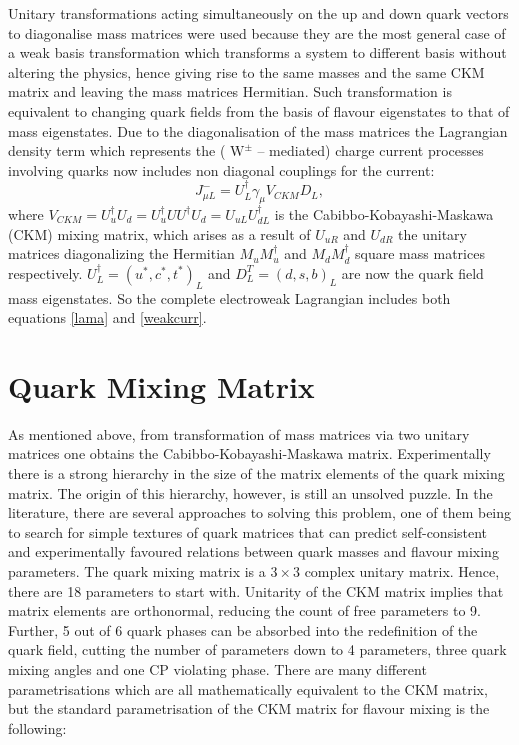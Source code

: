 \newline
\indent Unitary transformations acting simultaneously on the up and down quark vectors \cite{fritz} to diagonalise mass matrices were used because they are the most general case of a weak basis transformation which transforms a system to different basis without altering the physics, hence giving rise to the same masses and the same CKM matrix and leaving the mass matrices Hermitian. Such transformation is equivalent to changing quark fields from the basis of flavour eigenstates to that of mass eigenstates.
\newline
\indent Due to the diagonalisation of the mass matrices the Lagrangian density term which represents the ( $\text{W}^\pm$ -- mediated) charge current processes involving quarks now includes non diagonal couplings for the current:
\begin{equation}\label{weakcurr}
J_{\mu L}^-= U_{L}^{\dagger}\gamma_\mu V_{CKM}D_{L},
\end{equation}
where  $V_{CKM}= U_u^{\dagger} U_d= U_u^{\dag} U U^{\dag} U_d = U_{uL} U_{dL}^\dag$ is the Cabibbo-Kobayashi-Maskawa (CKM) mixing matrix, which arises as a result of $U_{uR}$ and $U_{dR}$ the unitary matrices diagonalizing the Hermitian $M_uM_u^\dagger$ and $M_dM_d^\dagger$ square mass matrices respectively. $U_{L}^\dagger =( u^{*}, c^{*}, t^{*})_L$ and $D_{L}^T=(d,s,b)_L$ are now the quark field mass eigenstates. So the complete electroweak Lagrangian includes both equations \ref{lama} and \ref{weakcurr}.

\section{Quark Mixing Matrix}
\indent As mentioned above, from transformation of mass matrices via two unitary matrices one obtains the Cabibbo-Kobayashi-Maskawa matrix. Experimentally there is a strong hierarchy in the size of the matrix elements of the quark mixing matrix. The origin of this hierarchy, however, is still an unsolved puzzle. In the literature, there  are several approaches to solving this problem, one of them being to search for simple textures of quark matrices that can predict self-consistent and experimentally favoured relations between quark masses and flavour mixing parameters. 
\newline 
\indent The quark mixing matrix is a $3 \times 3$ complex unitary matrix. Hence, there are 18 parameters to start with. Unitarity of the CKM matrix implies that matrix elements are orthonormal, reducing the count of free parameters to 9. Further, 5 out of 6 quark phases can be absorbed into the redefinition of the quark field, cutting the number of parameters down to 4 parameters, three quark mixing angles and one CP violating phase\cite{book}.
\newline
\indent There are many different parametrisations\cite{param} which are all mathematically equivalent to the CKM matrix, but the standard parametrisation of the CKM matrix for flavour mixing is the following:



